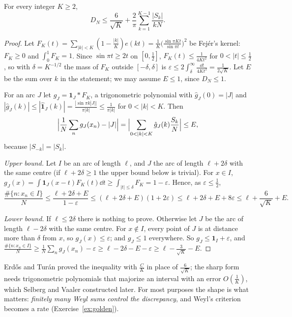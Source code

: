 \begin{theorem}\label{thm:erdosturan}
For every integer $K\ge2$,
\[
D_N\le\frac6{\sqrt K}+\frac2\pi\sum_{k=1}^{K-1}\frac{|S_k|}{kN}.
\]
\end{theorem}
\begin{proof}
Let $F_K(t)=\sum_{|k|<K}(1-\frac{|k|}K)e(kt)=\frac1K\bigl(\frac{\sin\pi Kt}{\sin\pi t}\bigr)^2$ be Fejér's kernel: $F_K\ge0$ and $\int_0^1F_K=1$. Since $\sin\pi t\ge2t$ on $[0,\frac12]$, $F_K(t)\le\frac1{4Kt^2}$ for $0<|t|\le\frac12$, so with $\delta=K^{-1/2}$ the mass of $F_K$ outside $[-\delta,\delta]$ is $\varepsilon\le2\int_\delta^\infty\frac{\dd t}{4Kt^2}=\frac1{2\sqrt K}$. Let $E$ be the sum over $k$ in the statement; we may assume $E\le1$, since $D_N\le1$.

For an arc $J$ let $g_J=\mathbf 1_J*F_K$, a trigonometric polynomial with $\hat g_J(0)=|J|$ and $|\hat g_J(k)|\le|\hat{\mathbf 1}_J(k)|=\frac{|\sin\pi k|J||}{\pi|k|}\le\frac1{\pi|k|}$ for $0<|k|<K$. Then
\[
\Bigl|\frac1N\sum_ng_J(x_n)-|J|\Bigr|=\Bigl|\sum_{0<|k|<K}\hat g_J(k)\frac{S_k}N\Bigr|\le E,
\]
because $|S_{-k}|=|S_k|$.

\emph{Upper bound.} Let $I$ be an arc of length $\ell$, and $J$ the arc of length $\ell+2\delta$ with the same centre (if $\ell+2\delta\ge1$ the upper bound below is trivial). For $x\in I$, $g_J(x)=\int\mathbf 1_J(x-t)F_K(t)\dd t\ge\int_{|t|\le\delta}F_K=1-\varepsilon$. Hence, as $\varepsilon\le\frac12$,
\[
\frac{\#\{n:x_n\in I\}}N\le\frac{\ell+2\delta+E}{1-\varepsilon}\le(\ell+2\delta+E)(1+2\varepsilon)\le\ell+2\delta+E+8\varepsilon\le\ell+\frac6{\sqrt K}+E.
\]

\emph{Lower bound.} If $\ell\le2\delta$ there is nothing to prove. Otherwise let $J$ be the arc of length $\ell-2\delta$ with the same centre. For $x\notin I$, every point of $J$ is at distance more than $\delta$ from $x$, so $g_J(x)\le\varepsilon$; and $g_J\le1$ everywhere. So $g_J\le\mathbf 1_I+\varepsilon$, and $\frac{\#\{n:x_n\in I\}}N\ge\frac1N\sum_ng_J(x_n)-\varepsilon\ge\ell-2\delta-E-\varepsilon\ge\ell-\frac3{\sqrt K}-E$.
\end{proof}

Erd\H{o}s and Turán proved the inequality with $\frac CK$ in place of $\frac6{\sqrt K}$; the sharp form needs trigonometric polynomials that majorize an interval with an error $O(\frac1K)$, which Selberg and Vaaler constructed later. For most purposes the shape is what matters: \emph{finitely many Weyl sums control the discrepancy}, and Weyl's criterion becomes a rate (Exercise~\ref{ex:golden}).

